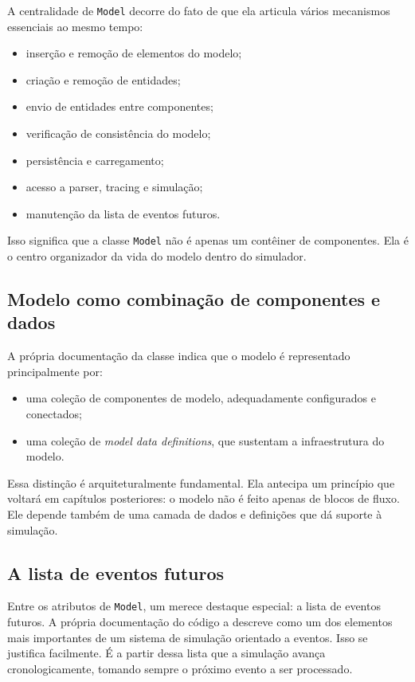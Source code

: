A centralidade de \texttt{Model} decorre do fato de que ela articula vários mecanismos essenciais ao mesmo tempo:
\begin{itemize}
    \item inserção e remoção de elementos do modelo;
    \item criação e remoção de entidades;
    \item envio de entidades entre componentes;
    \item verificação de consistência do modelo;
    \item persistência e carregamento;
    \item acesso a parser, tracing e simulação;
    \item manutenção da lista de eventos futuros.
\end{itemize}

Isso significa que a classe \texttt{Model} não é apenas um contêiner de componentes. Ela é o centro organizador da vida do modelo dentro do simulador.

\subsection{Modelo como combinação de componentes e dados}
\label{subsec:cap7_modelo_componentes_dados}

A própria documentação da classe indica que o modelo é representado principalmente por:
\begin{itemize}
    \item uma coleção de componentes de modelo, adequadamente configurados e conectados;
    \item uma coleção de \textit{model data definitions}, que sustentam a infraestrutura do modelo.
\end{itemize}

Essa distinção é arquiteturalmente fundamental. Ela antecipa um princípio que voltará em capítulos posteriores: o modelo não é feito apenas de blocos de fluxo. Ele depende também de uma camada de dados e definições que dá suporte à simulação.

\subsection{A lista de eventos futuros}
\label{subsec:cap7_lista_eventos_futuros}

Entre os atributos de \texttt{Model}, um merece destaque especial: a lista de eventos futuros. A própria documentação do código a descreve como um dos elementos mais importantes de um sistema de simulação orientado a eventos. Isso se justifica facilmente. É a partir dessa lista que a simulação avança cronologicamente, tomando sempre o próximo evento a ser processado.

